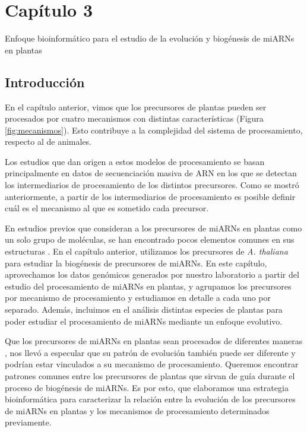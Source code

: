 
\graphicspath{{Chapter3/Figs/}}

\setcounter{chapter}{6}
\chapter*{Capítulo 3} 
\setcounter{figure}{0}
\setcounter{table}{0}
\setcounter{section}{0}

{\LARGE Enfoque bioinformático para el estudio de la evolución y biogénesis de miARNs en plantas}


\section{Introducción}

En el capítulo anterior, vimos que los precursores de plantas pueden ser procesados por cuatro mecanismos con distintas características (Figura \ref{fig:mecanismos}).
Esto contribuye a la complejidad del sistema de procesamiento, respecto al de animales.

Los estudios que dan origen a estos modelos de procesamiento se basan principalmente en datos de secuenciación masiva de ARN en los que se detectan los intermediarios de procesamiento de los distintos precursores.
Como se mostró anteriormente, a partir de los intermediarios de procesamiento es posible definir cuál es el mecanismo al que es sometido cada precursor.

En estudios previos que consideran a los precursores de miARNs en plantas como un solo grupo de moléculas, se han encontrado pocos elementos comunes en sus estructuras \citep{Mateos2010}.
En el capítulo anterior, utilizamos los precursores de \textit{A. thaliana} para estudiar la biogénesis de precursores de miARNs.
En este capítulo, aprovechamos los datos genómicos generados por nuestro laboratorio a partir del estudio del procesamiento de miARNs en plantas, y agrupamos los precursores por mecanismo de procesamiento y estudiamos en detalle a cada uno por separado.
Además, incluimos en el análisis distintas especies de plantas para poder estudiar el procesamiento de miARNs mediante un enfoque evolutivo.

Que los precursores de miARNs en plantas sean procesados de diferentes maneras \citep{Bologna2013}, nos llevó a especular que su patrón de evolución también puede ser diferente y podrían estar vinculados a su mecanismo de procesamiento.
Queremos encontrar patrones comunes entre los precursores de plantas que sirvan de guía durante el proceso de biogénesis de miARNs.
Es por esto, que elaboramos una estrategia bioinformática para caracterizar la relación entre la evolución de los precursores de miARNs en plantas y los mecanismos de procesamiento determinados previamente.

